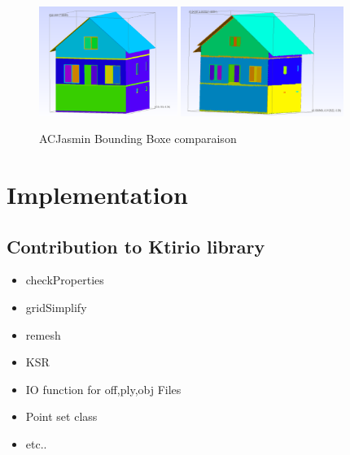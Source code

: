 \documentclass[10pt]{beamer}
\begin{document}
\begin{frame}
    
    \begin{figure}
    \includegraphics[width=0.4\textwidth]{../image/ACJasmin_input_bounding_box.png}
    \includegraphics[width=0.47\textwidth]{../image/ACjasmin_output_bounding_box.png}
    \caption{ACJasmin Bounding Boxe comparaison}
    \end{figure}
    
\end{frame}

\section{Implementation}
\subsection{Contribution to Ktirio library}
\begin{frame}{}
  \begin{itemize}
    \item checkProperties{}
    \item gridSimplify{}
    \item remesh{}
    \item KSR{}
    \item IO function for off,ply,obj Files
    \item Point set class
    \item etc..
  \end{itemize}

\end{frame}
\end{document}
